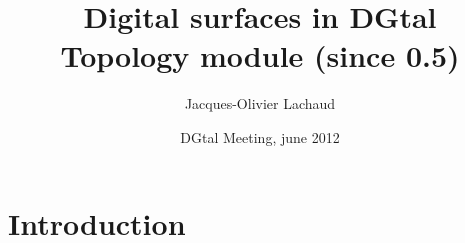 \documentclass[pdftex,francais]{beamer}
\title[Digital surfaces in DGtal]{Digital surfaces in DGtal\\
     Topology module (since 0.5)
}
\author[J.-O. Lachaud]{Jacques-Olivier Lachaud}
\date{DGtal Meeting, june 2012}
\begin{document}
\newlength{\unquart}
\setlength{\unquart}{0.21\textwidth}

\begin{frame}
  \titlepage
\end{frame}

\section{Introduction}

\end{document}
